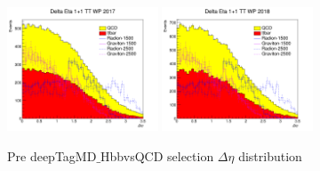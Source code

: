 \begin{figure}[!htb]
	\includegraphics[width=0.4\textwidth]{Figures/deltaEtaTT_17_deepTagMD_HbbvsQCD.png}
	\includegraphics[width=0.4\textwidth]{Figures/deltaEtaTT_18_deepTagMD_HbbvsQCD.png}
	\caption{Pre deepTagMD$\_$HbbvsQCD selection $\Delta \eta$ distribution}
	\label{fig:predeltaEtaBY}
\end{figure}
